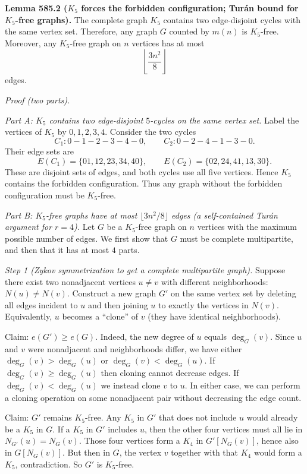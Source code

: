 \bigskip
\noindent\textbf{Lemma 585.2 ($K_5$ forces the forbidden configuration; Tur\'an bound for $K_5$-free graphs).}
The complete graph $K_5$ contains two edge-disjoint cycles with the same vertex set.
Therefore, any graph $G$ counted by $m(n)$ is $K_5$-free.
Moreover, any $K_5$-free graph on $n$ vertices has at most
\[
\left\lfloor \frac{3n^2}{8}\right\rfloor
\]
edges.

\noindent\emph{Proof (two parts).}

\emph{Part A: $K_5$ contains two edge-disjoint $5$-cycles on the same vertex set.}
Label the vertices of $K_5$ by $0,1,2,3,4$.
Consider the two cycles
\[
C_1: 0-1-2-3-4-0,\qquad
C_2: 0-2-4-1-3-0.
\]
Their edge sets are
\[
E(C_1)=\{01,12,23,34,40\},\qquad
E(C_2)=\{02,24,41,13,30\}.
\]
These are disjoint sets of edges, and both cycles use all five vertices.
Hence $K_5$ contains the forbidden configuration.
Thus any graph without the forbidden configuration must be $K_5$-free.

\emph{Part B: $K_5$-free graphs have at most $\lfloor 3n^2/8\rfloor$ edges (a self-contained Tur\'an argument for $r=4$).}
Let $G$ be a $K_5$-free graph on $n$ vertices with the maximum possible number of edges.
We first show that $G$ must be complete multipartite, and then that it has at most $4$ parts.

\emph{Step 1 (Zykov symmetrization to get a complete multipartite graph).}
Suppose there exist two nonadjacent vertices $u\ne v$ with different neighborhoods: $N(u)\ne N(v)$.
Construct a new graph $G'$ on the same vertex set by deleting all edges incident to $u$ and then joining $u$ to exactly the vertices in $N(v)$.
Equivalently, $u$ becomes a ``clone'' of $v$ (they have identical neighborhoods).

Claim: $e(G')\ge e(G)$.
Indeed, the new degree of $u$ equals $\deg_G(v)$.
Since $u$ and $v$ were nonadjacent and neighborhoods differ, we have either $\deg_G(v)>\deg_G(u)$ or $\deg_G(v)<\deg_G(u)$.
If $\deg_G(v)\ge \deg_G(u)$ then cloning cannot decrease edges.
If $\deg_G(v)<\deg_G(u)$ we instead clone $v$ to $u$.
In either case, we can perform a cloning operation on some nonadjacent pair without decreasing the edge count.

Claim: $G'$ remains $K_5$-free.
Any $K_5$ in $G'$ that does not include $u$ would already be a $K_5$ in $G$.
If a $K_5$ in $G'$ includes $u$, then the other four vertices must all lie in $N_{G'}(u)=N_G(v)$.
Those four vertices form a $K_4$ in $G'[N_G(v)]$, hence also in $G[N_G(v)]$.
But then in $G$, the vertex $v$ together with that $K_4$ would form a $K_5$, contradiction.
So $G'$ is $K_5$-free.

